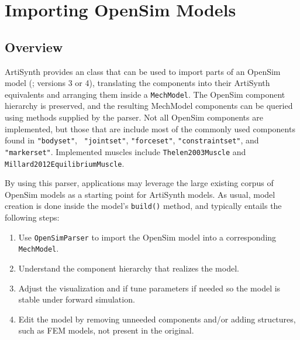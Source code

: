 \ifdefined\maindoc\else
\def\doctitle{Importing OpenSim Models}

\mainmatter
\fi

\chapter{Importing OpenSim Models}
\label{ImportingOpenSim:sec}

\section{Overview}

ArtiSynth provides an  class that can be used
to import parts of an OpenSim model (\cite{delp2007opensim}; versions 3 or 4),
translating the components into their ArtiSynth equivalents and arranging them
inside a {\tt MechModel}. The OpenSim component hierarchy is preserved, and the
resulting MechModel components can be queried using methods supplied by the
parser. Not all OpenSim components are implemented, but those that are include
most of the commonly used components found in {\tt "bodyset"}, {\tt
"jointset"}, {\tt "forceset"}, {\tt "constraintset"}, and {\tt "markerset"}.
Implemented muscles include {\tt Thelen2003Muscle} and {\tt
Millard2012EquilibriumMuscle}.

By using this parser, applications may leverage the large existing corpus of
OpenSim models as a starting point for ArtiSynth models. As usual, model
creation is done inside the model's {\tt build()} method, and typically entails
the following steps:

\begin{enumerate}

\item Use {\tt OpenSimParser} to import the OpenSim model into a corresponding
{\tt MechModel}.

\item Understand the component hierarchy that realizes the model.

\item Adjust the visualization and if tune parameters if needed so the model is
stable under forward simulation.

\item Edit the model by removing unneeded components and/or adding
structures, such as FEM models, not present in the original.

\end{enumerate}

